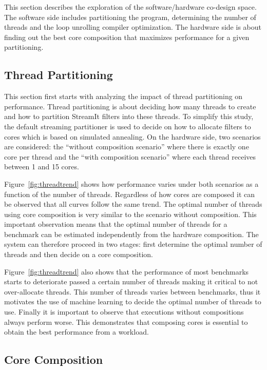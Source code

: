 This section describes the exploration of the software/hardware co-design space.
The software side includes partitioning the program, determining the number of threads and the loop unrolling compiler optimization.
The hardware side is about finding out the best core composition that maximizes performance for a given partitioning.

\subsection{Thread Partitioning}

This section first starts with analyzing the impact of thread partitioning on performance.
Thread partitioning is about deciding how many threads to create and how to partition StreamIt filters into these threads.
To simplify this study, the default streaming partitioner is used to decide on how to allocate filters to cores which is based on simulated annealing.
On the hardware side, two scenarios are considered:
the ``without composition scenario'' where there is exactly one core per thread and the ``with composition scenario'' where each thread receives between 1 and 15 cores.

Figure~\ref{fig:threadtrend} shows how performance varies under both scenarios as a function of the number of threads.
Regardless of how cores are composed it can be observed that all curves follow the same trend.
The optimal number of threads using core composition is very similar to the scenario without composition.
This important observation means that the optimal number of threads for a benchmark can be estimated independently from the hardware composition.
The system can therefore proceed in two stages: first determine the optimal number of threads and then decide on a core composition.

Figure~\ref{fig:threadtrend} also shows that the performance of most benchmarks starts to deteriorate passed a certain number of threads making it critical to not over-allocate threads.
This number of threads varies between benchmarks, thus it motivates the use of machine learning to decide the optimal number of threads to use.
Finally it is important to observe that executions without compositions always perform worse.
This demonstrates that composing cores is essential to obtain the best performance from a workload.


\subsection{Core Composition}


